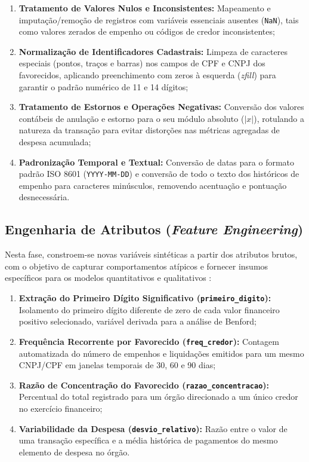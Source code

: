 \documentclass[
    12pt,               %
    openright,          %
    oneside,            %
    a4paper,            %
    chapter=TITLE,      %
    sumario=tradicional,%
    english,            %
    brazilian,          %
 ]{abntex2}
\begin{document}
\begin{enumerate}
    \item \textbf{Tratamento de Valores Nulos e Inconsistentes:} Mapeamento e imputação/remoção de registros com variáveis essenciais ausentes (\texttt{NaN}), tais como valores zerados de empenho ou códigos de credor inconsistentes;
    \item \textbf{Normalização de Identificadores Cadastrais:} Limpeza de caracteres especiais (pontos, traços e barras) nos campos de CPF e CNPJ dos favorecidos, aplicando preenchimento com zeros à esquerda (\textit{zfill}) para garantir o padrão numérico de 11 e 14 dígitos;
    \item \textbf{Tratamento de Estornos e Operações Negativas:} Conversão dos valores contábeis de anulação e estorno para o seu módulo absoluto ($|x|$), rotulando a natureza da transação para evitar distorções nas métricas agregadas de despesa acumulada;
    \item \textbf{Padronização Temporal e Textual:} Conversão de datas para o formato padrão ISO 8601 (\texttt{YYYY-MM-DD}) e conversão de todo o texto dos históricos de empenho para caracteres minúsculos, removendo acentuação e pontuação desnecessária.
\end{enumerate}

\subsection{Engenharia de Atributos (\textit{Feature Engineering})}\label{subsec:feature_engineering}

Nesta fase, constroem-se novas variáveis sintéticas a partir dos atributos brutos, com o objetivo de capturar comportamentos atípicos e fornecer insumos específicos para os modelos quantitativos e qualitativos \cite{pereira2025}:

\begin{enumerate}
    \item \textbf{Extração do Primeiro Dígito Significativo (\texttt{primeiro\_digito}):} Isolamento do primeiro dígito diferente de zero de cada valor financeiro positivo selecionado, variável derivada para a análise de Benford;
    \item \textbf{Frequência Recorrente por Favorecido (\texttt{freq\_credor}):} Contagem automatizada do número de empenhos e liquidações emitidos para um mesmo CNPJ/CPF em janelas temporais de 30, 60 e 90 dias;
    \item \textbf{Razão de Concentração do Favorecido (\texttt{razao\_concentracao}):} Percentual do total registrado para um órgão direcionado a um único credor no exercício financeiro;
    \item \textbf{Variabilidade da Despesa (\texttt{desvio\_relativo}):} Razão entre o valor de uma transação específica e a média histórica de pagamentos do mesmo elemento de despesa no órgão.
\end{enumerate}
\end{document}
